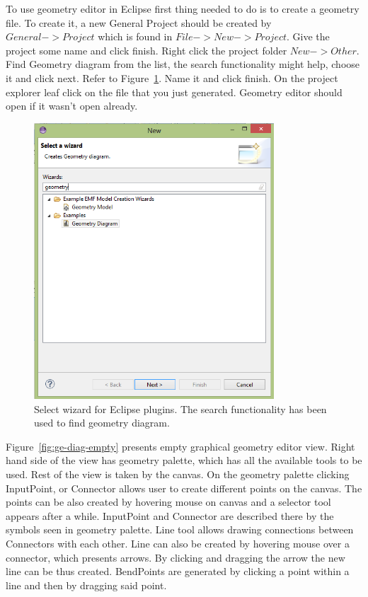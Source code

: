 To use geometry editor in Eclipse first thing needed to do is to create a geometry file. To create it, a new General Project should be created by $General->Project$ which is found in $File->New->Project$. Give the project some name and click finish. 
Right click the project folder $New->Other$. Find Geometry diagram from the list, the search functionality might help, choose it and click next. Refer to Figure~\ref{fig:ge-wiz-select}. Name it and click finish. On the project explorer leaf click on the file that you just generated. Geometry editor should open if it wasn't open already.

\begin{figure}[htp]
\begin{center}
  \includegraphics[width=0.8\textwidth]{image/ge-wiz-select.png}
  \caption{Select wizard for Eclipse plugins. The search functionality has been used to find geometry diagram.}
  \label{fig:ge-wiz-select}
\end{center}
\end{figure}

Figure~\ref{fig:ge-diag-empty} presents empty graphical geometry editor view. Right hand side of the view has geometry palette, which has all the available tools to be used. Rest of the view is taken by the canvas. On the geometry palette clicking InputPoint, or Connector allows user to create different points on the canvas. The points can be also created by hovering mouse on canvas and a selector tool appears after a while. InputPoint and Connector are described there by the symbols seen in geometry palette. Line tool allows drawing connections between Connectors with each other. Line can also be created by hovering mouse over a connector, which presents arrows. By clicking and dragging the arrow the new line can be thus created. BendPoints are generated by clicking a point within a line and then by dragging said point. 


